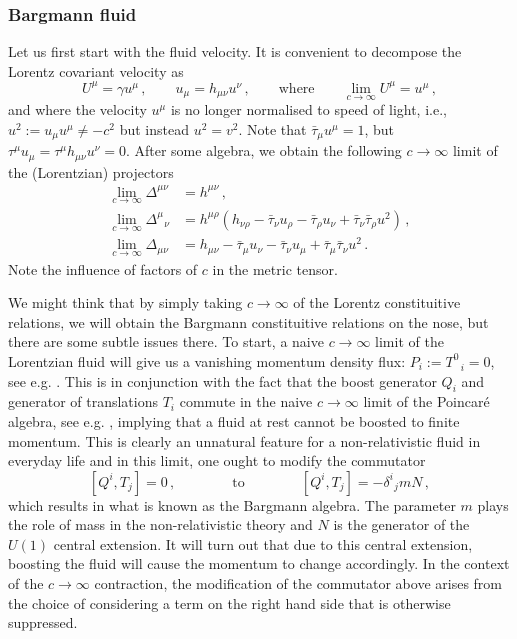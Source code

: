 \documentclass[superscriptaddress,prd,nofootinbib,preprintnumbers,longbibliography,11pt,eqsecnum]{revtex4-1}
\begin{document}
\subsubsection{Bargmann fluid}
Let us first start with the fluid velocity. It is convenient to decompose the Lorentz covariant velocity as 
\begin{equation}
  U^\mu = \gamma u^\mu \, ,\qquad u_\mu = h_{\mu \nu}u^\nu \, ,\qquad \text{where} \qquad \lim_{c\to \infty} U^\mu = u^\mu\,,
\end{equation}
and where the velocity $u^\mu$ is no longer normalised to speed of light, i.e., $u^2 := u_\mu u^\mu \ne -c^2$ but instead $u^2 = v^2$. Note that $\bar\tau_\mu u^\mu = 1$, but $\tau^\mu u_\mu = \tau^\mu h_{\mu \nu} u^\nu = 0$. After some algebra, we obtain the following $c\to \infty$ limit of the (Lorentzian) projectors 
\begin{equation}
\begin{aligned}
  \lim_{c\to \infty}\Delta^{\mu \nu} &= h^{\mu \nu} \, ,\\
   \lim_{c\to \infty}\Delta^{\mu}_{\;\;\,\nu} &= h^{\mu \rho} \left(h_{\nu \rho} - \bar\tau_{\nu}u_{\rho}- \bar\tau_{\rho}u_{\nu}  + \bar\tau_\nu \bar\tau_\rho u^2  \right) \, ,\\
   \lim_{c\to \infty}\Delta_{\mu \nu} &= h_{\mu \nu} - \bar\tau_{\mu}u_{\nu}- \bar\tau_{\nu}u_{\mu} + \bar\tau_\mu \bar\tau_\nu u^2  \, .
\end{aligned}
\end{equation}
Note the influence of factors of $c$ in the metric tensor.

We might think that by simply taking $c\to \infty$ of the Lorentz constituitive relations, we will obtain the Bargmann constituitive relations on the nose, but there are some subtle issues there. To start, a naive $c\to \infty$ limit of the Lorentzian fluid will give us a vanishing momentum density flux: $P_i := T^0_{\;\;\,i} = 0$, see e.g. \cite{deBoer:2017ing}. This is in conjunction with the fact that the boost generator $Q_i$ and generator of translations $T_i$ commute in the naive $c\to \infty$ limit of the Poincar\'{e} algebra, see e.g. \cite{Andringa:2010it}, implying that a fluid at rest cannot be boosted to finite momentum. This is clearly an unnatural feature for a non-relativistic fluid in everyday life and in this limit, one ought to modify the commutator 
\begin{equation}\nonumber
[Q^i,T_j] = 0\,,\qquad \qquad \text{to} \qquad \qquad [Q^i,T_j] = -\delta^i_{\;\,j} m N\,,
\end{equation}
which results in what is known as the Bargmann algebra. The parameter $m$ plays the role of mass in the non-relativistic theory and $N$ is the generator of the $U(1)$ central extension. It will turn out that due to this central extension, boosting the fluid will cause the momentum to change accordingly. In the context of the $c\to\infty$ contraction, the modification of the commutator above arises from the choice of considering a term on the right hand side that is otherwise suppressed.
\end{document}
